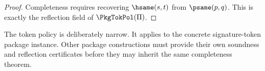 \begin{proof}
Completeness requires recovering \(\hsame(s,t)\) from \(\psame(p,q)\). This is exactly the reflection field of \(\PkgTokPol(\Pi)\).
\end{proof}

\begin{remark}
The token policy is deliberately narrow. It applies to the concrete signature-token package instance. Other package constructions must provide their own soundness and reflection certificates before they may inherit the same completeness theorem.
\end{remark}
